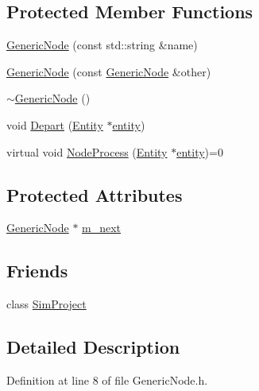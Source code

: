 \subsection*{Protected Member Functions}
\begin{DoxyCompactItemize}
\item 
\hyperlink{class_generic_node_acf8f931dab598c16e00255257fee132d}{Generic\+Node} (const std\+::string \&name)
\item 
\hyperlink{class_generic_node_a9b0f3cb66385b487944d4f28069546f3}{Generic\+Node} (const \hyperlink{class_generic_node}{Generic\+Node} \&other)
\item 
\hyperlink{class_generic_node_ae97c1f46c781cbf09bfa7054097baa2a}{$\sim$\+Generic\+Node} ()
\item 
void \hyperlink{class_generic_node_a2d573208cd3bc049c7068a331c6cd294}{Depart} (\hyperlink{class_entity}{Entity} $\ast$\hyperlink{_entity_8h_ad79a57ed3105eb60d991a1aeb4a9dc44a428e8fcd53019fa239fa3419261e499e}{entity})
\item 
virtual void \hyperlink{class_generic_node_ae942258a57f211072d179da470579add}{Node\+Process} (\hyperlink{class_entity}{Entity} $\ast$\hyperlink{_entity_8h_ad79a57ed3105eb60d991a1aeb4a9dc44a428e8fcd53019fa239fa3419261e499e}{entity})=0
\end{DoxyCompactItemize}
\subsection*{Protected Attributes}
\begin{DoxyCompactItemize}
\item 
\hyperlink{class_generic_node}{Generic\+Node} $\ast$ \hyperlink{class_generic_node_af1d326d888b277b40d55b3c67be446d7}{m\+\_\+next}
\end{DoxyCompactItemize}
\subsection*{Friends}
\begin{DoxyCompactItemize}
\item 
class \hyperlink{class_generic_node_ac000f31a1ff045f2add284ea5877f0b5}{Sim\+Project}
\end{DoxyCompactItemize}


\subsection{Detailed Description}


Definition at line 8 of file Generic\+Node.\+h.



